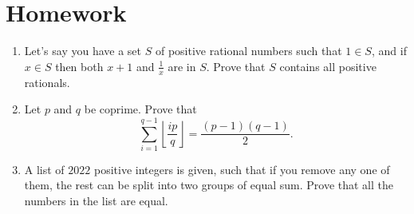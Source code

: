 \documentclass{article}
\begin{document}
\section{Homework}
  \begin{enumerate}
    \item Let's say you have a set $S$ of positive rational numbers such that
      $1\in S$, and if $x\in S$ then both $x+1$ and $\frac 1x$ are in $S$. Prove
      that $S$ contains all positive rationals.
    \item Let $p$ and $q$ be coprime. Prove that
      \[\sum_{i=1}^{q-1}\left\lfloor\frac{ip}{q}\right\rfloor=\frac{(p-1)(q-1)}2.\]
    \item A list of $2022$ positive integers is given, such that if you remove
      any one of them, the rest can be split into two groups of equal sum.
      Prove that all the numbers in the list are equal.
  \end{enumerate}
\end{document}
